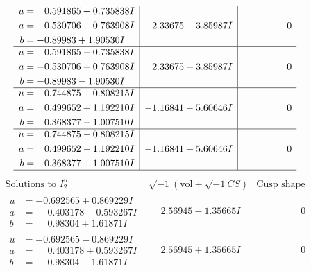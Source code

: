 \documentclass[1p]{elsarticle_modified}
\theoremstyle{definition}
\newcommand{\I}{\sqrt{-1}}
\begin{document}
$$\begin{array}{c|c|c}
\begin{aligned}
u &= \phantom{-}0.591865 + 0.735838 I \\
a &= -0.530706 - 0.763908 I \\
b &= -0.89983 + 1.90530 I\end{aligned}
 & \phantom{-}2.33675 - 3.85987 I & \phantom{-0.000000 } 0 \\ \hline\begin{aligned}
u &= \phantom{-}0.591865 - 0.735838 I \\
a &= -0.530706 + 0.763908 I \\
b &= -0.89983 - 1.90530 I\end{aligned}
 & \phantom{-}2.33675 + 3.85987 I & \phantom{-0.000000 } 0 \\ \hline\begin{aligned}
u &= \phantom{-}0.744875 + 0.808215 I \\
a &= \phantom{-}0.499652 + 1.192210 I \\
b &= \phantom{-}0.368377 - 1.007510 I\end{aligned}
 & -1.16841 - 5.60646 I & \phantom{-0.000000 } 0 \\ \hline\begin{aligned}
u &= \phantom{-}0.744875 - 0.808215 I \\
a &= \phantom{-}0.499652 - 1.192210 I \\
b &= \phantom{-}0.368377 + 1.007510 I\end{aligned}
 & -1.16841 + 5.60646 I & \phantom{-0.000000 } 0\\
 \hline 
 \end{array}$$\newpage$$\begin{array}{c|c|c}  
\text{Solutions to }I^u_{2}& \I (\text{vol} + \sqrt{-1}CS) & \text{Cusp shape}\\
 \hline 
\begin{aligned}
u &= -0.692565 + 0.869229 I \\
a &= \phantom{-}0.403178 - 0.593267 I \\
b &= \phantom{-}0.98304 + 1.61871 I\end{aligned}
 & \phantom{-}2.56945 - 1.35665 I & \phantom{-0.000000 } 0 \\ \hline\begin{aligned}
u &= -0.692565 - 0.869229 I \\
a &= \phantom{-}0.403178 + 0.593267 I \\
b &= \phantom{-}0.98304 - 1.61871 I\end{aligned}
 & \phantom{-}2.56945 + 1.35665 I & \phantom{-0.000000 } 0 \\ \hline\begin{aligned}

\end{aligned}
\end{array}$$
\end{document}

